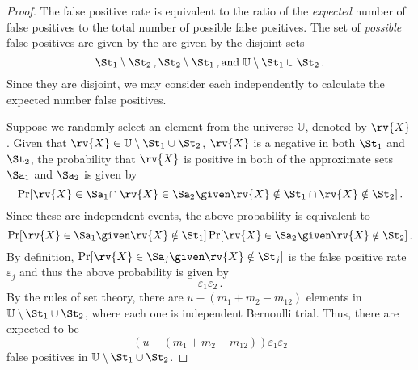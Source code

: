 \documentclass[ ../main.tex]{subfiles}
\begin{document}
\begin{proof}
The false positive rate is equivalent to the ratio of the \emph{expected} number of false positives to the total number of possible false positives. The set of \emph{possible} false positives are given by the are given by the disjoint sets
\begin{equation}
    \St_1 \setminus \St_2\,, \St_2 \setminus \St_1\,, \text{and} \; \mathbb{U} \setminus \St_1 \cup \St_2\,.
\end{equation}
Since they are disjoint, we may consider each independently to calculate the expected number false positives.

Suppose we randomly select an element from the universe $\mathbb{U}$, denoted by $\rv{X}$. Given that $\rv{X} \in \mathbb{U} \setminus \St_1 \cup \St_2$, $\rv{X}$ is a negative in both $\St_1$ and $\St_2$, the probability that $\rv{X}$ is positive in both of the approximate sets $\Sa_1$ and $\Sa_2$ is given by
\begin{equation}
    \Pr[\rv{X} \in \Sa_1 \! \cap \rv{X} \in \Sa_2 \given \rv{X} \notin \St_1 \cap \rv{X} \notin \St_2]\,.
\end{equation}
Since these are independent events, the above probability is equivalent to
\begin{equation}
    \Pr[\rv{X} \in \Sa_1 \given \rv{X} \notin \St_1] \Pr[\rv{X} \in \Sa_2 \given \rv{X} \notin \St_2]\,.
\end{equation}
By definition, $\Pr[\rv{X} \in \Sa_j \given \rv{X} \notin \St_j]$ is the false positive rate $\varepsilon_j$ and thus the above probability is given by
\begin{equation}
    \varepsilon_1 \varepsilon_2\,.
\end{equation}
By the rules of set theory, there are $u - (m_1 + m_2 - m_{1 2})$ elements in $\mathbb{U} \setminus \St_1 \cup \St_2$, where each one is independent Bernoulli trial. Thus, there are expected to be
\begin{equation}
    (u - (m_1 + m_2 - m_{1 2})) \varepsilon_1 \varepsilon_2
\end{equation}
false positives in $\mathbb{U} \setminus \St_1 \cup \St_2$.


\end{proof}
\end{document}
